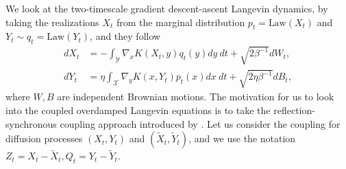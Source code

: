 \documentclass[11pt]{article}
\newcommand{\1}{\mathds{1}}
\begin{document}
We look at the two-timescale gradient descent-ascent Langevin dynamics, by taking the realizations $X_t$ from the marginal distribution $ p_t = \text{Law}(X_t)$ and $Y_t\sim q_t = \text{Law}(Y_t)$, and they follow
\begin{subequations}\label{eqn:121}
\begin{align}
    dX_t &=-\int_{\mathcal{Y}} \nabla_x K(X_t,y) q_t(y) dy ~dt + \sqrt{2\beta^{-1}} dW_t,\\
    dY_t&=\eta \int_{\mathcal{X}} \nabla_y K(x,Y_t) p_t(x) dx~ dt + \sqrt{2\eta\beta^{-1}} dB_t,
\end{align}
\end{subequations}
where $W, B$ are independent Brownian motions. The motivation for us to look into the coupled overdamped Langevin equations is to take the reflection-synchronous coupling approach introduced by \cite{eberle2016reflection}. Let us consider the coupling for diffusion processes $(X_t, Y_t) $ and $(\tilde{X}_t, \tilde{Y}_t)$, and we use the notation $Z_t = X_t-\tilde{X}_t, Q_t = Y_t- \tilde{Y}_t$. 
\end{document}
